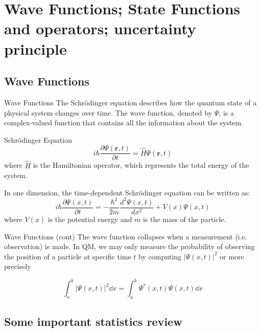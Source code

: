 
\section[Wave Functions]{Wave Functions; State Functions and operators; uncertainty principle}
\subsection{Wave Functions}

\begin{frame}{Wave Functions}
	The Schrödinger equation describes how the quantum state of a physical system changes over time. The wave function, denoted by $\Psi$, is a complex-valued function that contains all the information about the system.

	\begin{block}{Schrödinger Equation}
		\begin{equation*}
			i\hbar \frac{\partial \Psi(\mathbf{r}, t)}{\partial t} = \hat{H} \Psi(\mathbf{r}, t)
		\end{equation*}
		where $\hat{H}$ is the Hamiltonian operator, which represents the total energy of the system.

		In one dimension, the time-dependent Schrödinger equation can be written as:
		\begin{equation*}
			i\hbar \frac{\partial \Psi(x, t)}{\partial t} = -\frac{\hbar^2}{2m} \frac{d^2 \Psi(x, t)}{dx^2} + V(x) \Psi(x, t)
		\end{equation*}
		where $V(x)$ is the potential energy and $m$ is the mass of the particle.

	\end{block}

\end{frame}

\begin{frame}{Wave Functions (cont)}
	The wave function collapses when a measurement (i.e. observation) is made.
	In QM, we may only measure the probability of observing the position of a particle at specific time $t$ by computing $|\Psi(x,t)|^2$ or more precisely
	\begin{block}

		\[
			\int_a^b |\Psi(x,t)|^2 \dd{x} = \int_a^b \Psi^*(x,t) \Psi(x,t) \dd{x}
		\]

	\end{block}
\end{frame}

\subsection[Stats review]{Some important statistics review}

